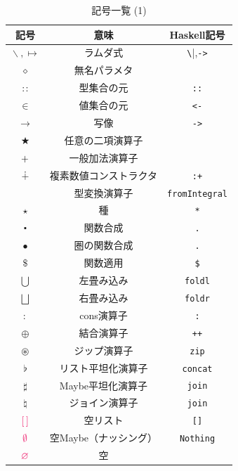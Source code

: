 \documentclass[a5paper,twoside,fleqn,draft]{jsbook}
\def\constantColor{WildStrawberry}
\newcommand{\programminglanguage}[1]{\textsf{#1}}
\newcommand{\haskell}{\programminglanguage{Haskell}}
\newcommand{\code}[1]{\texttt{#1}}
\newcommand{\mEmptyList}{{\textcolor{\constantColor}{[\,]}}}
\newcommand{\mNothing}{\textcolor{\constantColor}{\emptyset}}
\newcommand{\mPureNothing}{\textcolor{\constantColor}{\varnothing}}
\newcommand{\mAnonParam}{\diamond}
\newcommand{\mUpCast}{\bigtriangleup}
\DeclareMathOperator{\mFromIntegral}{\mUpCast_\text{Integral}}
\DeclareMathOperator{\mAppend}{\oplus}
\DeclareMathOperator{\mApply}{\$}
\DeclareMathOperator{\mApplyRight}{\rightsquigarrow}
\DeclareMathOperator{\mBinOp}{\bigstar}
\DeclareMathOperator{\mCompFunc}{\centerdot}
\DeclareMathOperator{\mCompCat}{\bullet}
\DeclareMathOperator{\mComplexPlus}{\dotplus}
\DeclareMathOperator*{\mFold}{\bigcup}
\DeclareMathOperator*{\mFoldRight}{\bigsqcup}
\DeclareMathOperator{\mFuncArrow}{\rightarrow}
\DeclareMathOperator{\mIn}{{:\!:}}
\DeclareMathOperator{\mJoin}{\natural}
\DeclareMathOperator{\mJoinList}{\flat} %
\DeclareMathOperator{\mJoinMaybe}{\sharp}
\DeclareMathOperator{\mLambda}{\backslash}
\DeclareMathOperator{\mLambdaArrow}{\mapsto}
\DeclareMathOperator{\mPlus}{\bf{+}} %
\DeclareMathOperator{\mUnOp}{\star}
\DeclareMathOperator{\mZip}{\circledast}
\begin{document}
\begin{table}[p]
\caption{記号一覧 (1)}
\begin{center}
\begin{tabular}{||c|c|c||}
\hline
記号&意味&\haskell 記号\\
\hline\hline
$\mLambda, \mLambdaArrow$&ラムダ式&\verb|\|,\code{->}\\
$\mAnonParam$&無名パラメタ&\\
\hline
$\mIn$&型集合の元&\code{::}\\
$\in$&値集合の元&\code{<-}\\
$\mFuncArrow$&写像&\code{->}\\
\hline
$\mBinOp$&任意の二項演算子&\\
$\mPlus$&一般加法演算子&\\
\hline
$\mComplexPlus$&複素数値コンストラクタ&\code{:+}\\
\hline
$\mFromIntegral$&型変換演算子&\code{fromIntegral}\\
$\star$&種&\code{*}\\
\hline
$\mCompFunc$&関数合成&\code{.}\\
$\mCompCat$&圏の関数合成&\code{.}\\
$\mApply$&関数適用&\code{\$}\\
\hline
$\mFold$&左畳み込み&\code{foldl}\\
$\mFoldRight$&右畳み込み&\code{foldr}\\
\hline
$:$&cons演算子&\code{:}\\
$\mAppend$&結合演算子&\code{++}\\
$\mZip$&ジップ演算子&\code{zip}\\
\hline
$\mJoinList$&リスト平坦化演算子&\code{concat}\\
$\mJoinMaybe$&Maybe平坦化演算子&\code{join}\\
$\mJoin$&ジョイン演算子&\code{join}\\
\hline
$\mEmptyList$&空リスト&\code{[]}\\
$\mNothing$&空Maybe（ナッシング）&\code{Nothing}\\
$\mPureNothing$&空&\\
\hline
\end{tabular}
\end{center}
\end{table}
\end{document}
